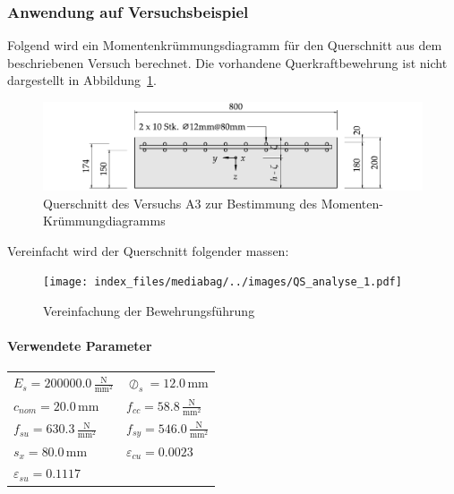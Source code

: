 \documentclass[
  12pt,
  letterpaper,
  egregdoesnotlikesansseriftitles]{scrreprt}
\let\oldparagraph\paragraph
\renewcommand{\paragraph}[1]{\oldparagraph{#1}\mbox{}}
\begin{document}
\hypertarget{anwendung-auf-versuchsbeispiel}{%
\subsubsection{Anwendung auf
Versuchsbeispiel}\label{anwendung-auf-versuchsbeispiel}}

Folgend wird ein Momentenkrümmungsdiagramm für den Querschnitt aus dem
beschriebenen Versuch berechnet. Die vorhandene Querkraftbewehrung ist
nicht dargestellt in Abbildung~\ref{fig-qs_a3}.

\begin{figure}[H]

{\centering \includegraphics{index_files/mediabag/../images/QS_Versuch_A3.pdf}

}

\caption{\label{fig-qs_a3}Querschnitt des Versuchs A3 zur Bestimmung des
Momenten-Krümmungdiagramms}

\end{figure}

Vereinfacht wird der Querschnitt folgender massen:

\begin{figure}[H]

{\centering \texttt{[image: index\_files/mediabag/../images/QS\_analyse\_1.pdf]}

}

\caption{Vereinfachung der Bewehrungsführung}

\end{figure}

\hypertarget{verwendete-parameter}{%
\paragraph{Verwendete Parameter}\label{verwendete-parameter}}

\begin{longtable}[]{@{}
  >{\raggedright\arraybackslash}p{}
  >{\raggedright\arraybackslash}p{}@{}}
\toprule\noalign{}
\endhead
\bottomrule\noalign{}
\endlastfoot
\(E_{s} = 200000.0 \, \frac{\text{N}}{\text{mm}^{2}}\) &
\(\oslash_{s} = 12.0 \, \text{mm}\) \\
\(c_{nom} = 20.0 \, \text{mm}\) &
\(f_{cc} = 58.8 \, \frac{\text{N}}{\text{mm}^{2}}\) \\
\(f_{su} = 630.3 \, \frac{\text{N}}{\text{mm}^{2}}\) &
\(f_{sy} = 546.0 \, \frac{\text{N}}{\text{mm}^{2}}\) \\
\(s_{x} = 80.0 \, \text{mm}\) & \(\varepsilon_{cu} = 0.0023\) \\
\(\varepsilon_{su} = 0.1117\) & \\
\end{longtable}
\end{document}
